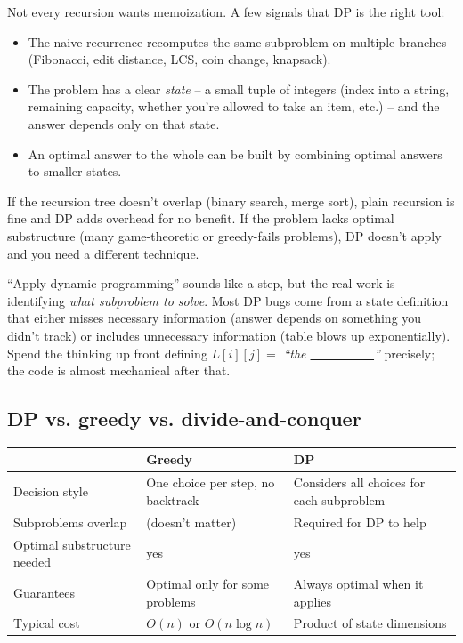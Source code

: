 \documentclass[11pt]{article}
\begin{document}
Not every recursion wants memoization. A few signals that DP is the
right tool:

\begin{itemize}[leftmargin=*]
    \item The naive recurrence recomputes the same subproblem on
          multiple branches (Fibonacci, edit distance, LCS, coin
          change, knapsack).
    \item The problem has a clear \emph{state} -- a small tuple of
          integers (index into a string, remaining capacity,
          whether you're allowed to take an item, etc.) -- and the
          answer depends only on that state.
    \item An optimal answer to the whole can be built by combining
          optimal answers to smaller states.
\end{itemize}

If the recursion tree doesn't overlap (binary search, merge sort),
plain recursion is fine and DP adds overhead for no benefit. If the
problem lacks optimal substructure (many game-theoretic or
greedy-fails problems), DP doesn't apply and you need a different
technique.

\begin{warnbox}
``Apply dynamic programming'' sounds like a step, but the real work
is identifying \emph{what subproblem to solve}. Most DP bugs come
from a state definition that either misses necessary information
(answer depends on something you didn't track) or includes
unnecessary information (table blows up exponentially). Spend the
thinking up front defining $L[i][j] = $ \emph{``the
\underline{\ \ \ \ \ \ \ \ \ \ }''} precisely; the code is almost
mechanical after that.
\end{warnbox}

\subsection{DP vs. greedy vs. divide-and-conquer}

\begin{center}
\small
\begin{tabular}{p{3.0cm} p{4.5cm} p{4.5cm}}
& \textbf{Greedy} & \textbf{DP} \\
\hline
Decision style & One choice per step, no backtrack & Considers all
choices for each subproblem \\
Subproblems overlap & (doesn't matter) & Required for DP to help \\
Optimal substructure needed & yes & yes \\
Guarantees & Optimal only for some problems & Always optimal when
it applies \\
Typical cost & $O(n)$ or $O(n \log n)$ & Product of state
dimensions \\
\end{tabular}
\normalsize
\end{center}
\end{document}
